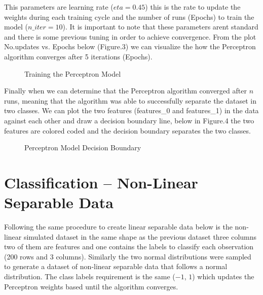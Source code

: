 \documentclass[12pt]{article} %
\begin{document}
This parameters are learning rate ($eta=0.45$) this is the rate to update the weights during each training cycle and the number of runs (Epochs) to train the model ($n\_iter = 10$). It is important to note that these parameters arent standard and there is some previous tuning in order to achieve convergence. From the plot No.updates vs. Epochs below (Figure.3) we can visualize the how the Perceptron algorithm converges after 5 iterations (Epochs).

\begin{figure}[ht]
\caption{Training the Perceptron Model}\label{fig:Perceptron01}
\centering
\end{figure}

Finally when we can determine that the Perceptron algorithm converged after $n$ runs, meaning that the algorithm was able to successfully separate the dataset in two classes. We can plot the two features (features\_0 and features\_1) in the data against each other and draw a decision boundary line, below in Figure.4 the two features are colored coded and the decision boundary separates the two classes.

\begin{figure}[ht]
\caption{Perceptron Model Decision Boundary }\label{fig:Perceptron02}
\centering
\end{figure}


\section{Classification -- Non-Linear Separable Data}

Following the same procedure to create linear separable data below is the non-linear simulated dataset in the same shape as the previous dataset three columns two of them are features and one contains the labels to classify each observation (200 rows and 3 columns). Similarly the two normal distributions were sampled to generate a dataset of non-linear separable data that follows a normal distribution. The class labels requirement is the same ($-1$, $1$) which updates the Perceptron weights based until the algorithm converges. 
\end{document}
